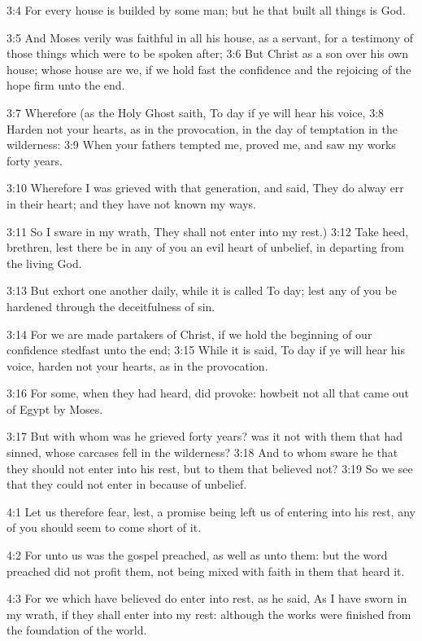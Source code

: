 3:4 For every house is builded by some man; but he that built all things is God.

3:5 And Moses verily was faithful in all his house, as a servant, for a testimony of those things which were to be spoken after; 3:6 But Christ as a son over his own house; whose house are we, if we hold fast the confidence and the rejoicing of the hope firm unto the end.

3:7 Wherefore (as the Holy Ghost saith, To day if ye will hear his voice, 3:8 Harden not your hearts, as in the provocation, in the day of temptation in the wilderness: 3:9 When your fathers tempted me, proved me, and saw my works forty years.

3:10 Wherefore I was grieved with that generation, and said, They do alway err in their heart; and they have not known my ways.

3:11 So I sware in my wrath, They shall not enter into my rest.)  3:12 Take heed, brethren, lest there be in any of you an evil heart of unbelief, in departing from the living God.

3:13 But exhort one another daily, while it is called To day; lest any of you be hardened through the deceitfulness of sin.

3:14 For we are made partakers of Christ, if we hold the beginning of our confidence stedfast unto the end; 3:15 While it is said, To day if ye will hear his voice, harden not your hearts, as in the provocation.

3:16 For some, when they had heard, did provoke: howbeit not all that came out of Egypt by Moses.

3:17 But with whom was he grieved forty years? was it not with them that had sinned, whose carcases fell in the wilderness?  3:18 And to whom sware he that they should not enter into his rest, but to them that believed not?  3:19 So we see that they could not enter in because of unbelief.

4:1 Let us therefore fear, lest, a promise being left us of entering into his rest, any of you should seem to come short of it.

4:2 For unto us was the gospel preached, as well as unto them: but the word preached did not profit them, not being mixed with faith in them that heard it.

4:3 For we which have believed do enter into rest, as he said, As I have sworn in my wrath, if they shall enter into my rest: although the works were finished from the foundation of the world.

